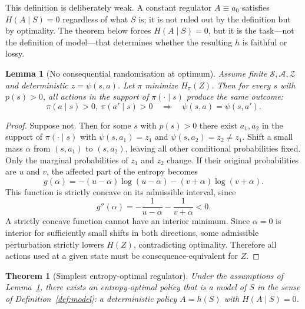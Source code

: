 \documentclass[11pt]{article}
\newtheorem{lemma}{Lemma}
\newtheorem{theorem}{Theorem}
\theoremstyle{remark}
\newcommand{\Acal}{\mathcal A}
\newcommand{\Scal}{\mathcal S}
\newcommand{\Zcal}{\mathcal Z}
\newcommand{\1}{\mathbb 1}
\begin{document}
This definition is deliberately weak. A constant regulator $A\equiv a_0$ satisfies $H(A\mid S)=0$ regardless of what $S$ is; it is not ruled out by the definition but by optimality. The theorem below forces $H(A\mid S)=0$, but it is the task---not the definition of model---that determines whether the resulting $h$ is faithful or lossy.

\begin{lemma}[No consequential randomisation at optimum]
\label{lem:no-consequential-randomisation}
Assume finite $\Scal,\Acal,\Zcal$ and deterministic $z=\psi(s,a)$. Let $\pi$ minimize $H_\pi(Z)$. Then for every $s$ with $p(s)>0$, all actions in the support of $\pi(\cdot\mid s)$ produce the same outcome:
\begin{equation}
    \pi(a\mid s)>0,\ \pi(a'\mid s)>0
    \quad \Rightarrow \quad
    \psi(s,a)=\psi(s,a').
\end{equation}
\end{lemma}

\begin{proof}
Suppose not. Then for some $s$ with $p(s)>0$ there exist $a_1,a_2$ in the support of $\pi(\cdot\mid s)$ with $\psi(s,a_1)=z_1$ and $\psi(s,a_2)=z_2\ne z_1$. Shift a small mass $\alpha$ from $(s,a_1)$ to $(s,a_2)$, leaving all other conditional probabilities fixed. Only the marginal probabilities of $z_1$ and $z_2$ change. If their original probabilities are $u$ and $v$, the affected part of the entropy becomes
\begin{equation}
    g(\alpha)=-(u-\alpha)\log(u-\alpha)-(v+\alpha)\log(v+\alpha).
\end{equation}
This function is strictly concave on its admissible interval, since
\begin{equation}
    g''(\alpha)= -\frac{1}{u-\alpha}-\frac{1}{v+\alpha}<0.
\end{equation}
A strictly concave function cannot have an interior minimum. Since $\alpha=0$ is interior for sufficiently small shifts in both directions, some admissible perturbation strictly lowers $H(Z)$, contradicting optimality. Therefore all actions used at a given state must be consequence-equivalent for $Z$.
\end{proof}

\begin{theorem}[Simplest entropy-optimal regulator]
\label{thm:simplest-regulator}
Under the assumptions of Lemma~\ref{lem:no-consequential-randomisation}, there exists an entropy-optimal policy that is a model of $S$ in the sense of Definition~\ref{def:model}: a deterministic policy $A=h(S)$ with $H(A\mid S)=0$.
\end{theorem}
\end{document}

